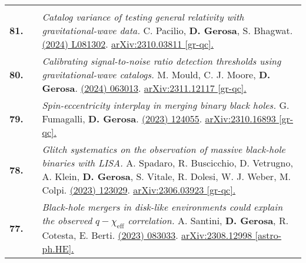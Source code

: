 {\begin{longtable}{rp{0.3cm}p{15.8cm}}
\vspace{0.09cm}\\
%
\textbf{81.} & & \textit{Catalog variance of testing general relativity with gravitational-wave data.}
\newline{}
C. Pacilio, \textbf{D. Gerosa}, S. Bhagwat.
\newline{}
\href{https://journals.aps.org/prd/abstract/10.1103/PhysRevD.109.L081302}{\prdl 109 (2024) L081302}. \href{https://arxiv.org/abs/2310.03811}{arXiv:2310.03811 [gr-qc].}
\vspace{0.09cm}\\
%
\textbf{80.} & & \textit{Calibrating signal-to-noise ratio detection thresholds using gravitational-wave catalogs.}
\newline{}
M. Mould, C. J. Moore, \textbf{D. Gerosa}.
\newline{}
\href{https://journals.aps.org/prd/abstract/10.1103/PhysRevD.109.063013}{\prd 109 (2024) 063013}. \href{https://arxiv.org/abs/2311.12117}{arXiv:2311.12117 [gr-qc].}
\vspace{0.09cm}\\
%
\textbf{79.} & & \textit{Spin-eccentricity interplay in merging binary black holes.}
\newline{}
G. Fumagalli, \textbf{D. Gerosa}.
\newline{}
\href{https://journals.aps.org/prd/abstract/10.1103/PhysRevD.108.124055}{\prd 108 (2023) 124055}. \href{https://arxiv.org/abs/2310.16893}{arXiv:2310.16893 [gr-qc].}
\vspace{0.09cm}\\
%
\textbf{78.} & & \textit{Glitch systematics on the observation of massive black-hole binaries with LISA.}
\newline{}
A. Spadaro, R. Buscicchio, D. Vetrugno, A. Klein, \textbf{D. Gerosa}, S. Vitale, R. Dolesi, W. J. Weber, M. Colpi.
\newline{}
\href{https://journals.aps.org/prd/abstract/10.1103/PhysRevD.108.123029}{\prd 108 (2023) 123029}. \href{https://arxiv.org/abs/2306.03923}{arXiv:2306.03923 [gr-qc].}
\vspace{0.09cm}\\
%
\textbf{77.} & & \textit{Black-hole mergers in disk-like environments could explain the observed $q-\chi_\mathrm{eff}$ correlation.}
\newline{}
A. Santini, \textbf{D. Gerosa}, R. Cotesta, E. Berti.
\newline{}
\href{https://journals.aps.org/prd/abstract/10.1103/PhysRevD.108.083033}{\prd 108 (2023) 083033}. \href{https://arxiv.org/abs/2308.12998}{arXiv:2308.12998 [astro-ph.HE].}

\end{longtable}}
